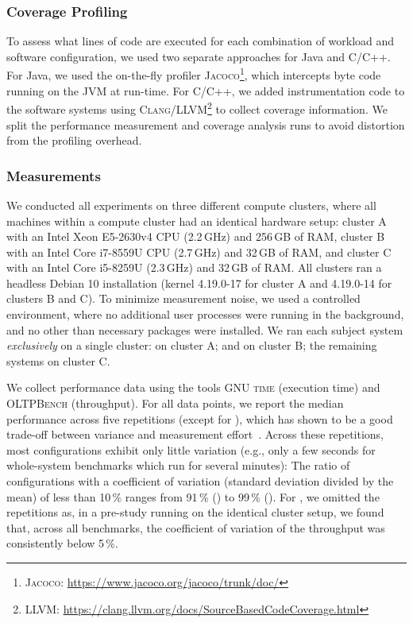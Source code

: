{\subsubsection{Coverage Profiling}\label{sec:profiling}
To assess what lines of code are executed for each combination of workload and software configuration, we used two separate approaches for Java and C/C++. For Java, we used the on-the-fly profiler \textsc{Jacoco}\footnote{\textsc{Jacoco}: \url{https://www.jacoco.org/jacoco/trunk/doc/}}, which intercepts byte code running on the JVM at run-time. For C/C++, we added instrumentation code to the software systems using \textsc{Clang/LLVM}\footnote{\textsc{LLVM}: \url{https://clang.llvm.org/docs/SourceBasedCodeCoverage.html}} to collect coverage information. We split the performance measurement and coverage analysis runs to  avoid distortion from the profiling overhead.
	
\subsubsection{Measurements}\label{sec:measurement_setup}
We conducted all experiments on three different compute clusters, where all machines within a compute cluster had an identical hardware setup: cluster A with an Intel Xeon E5-2630v4 CPU (2.2\,GHz) and 256\,GB of RAM, cluster B  with an Intel Core i7-8559U CPU (2.7\,GHz) and 32\,GB of RAM, and cluster C with an Intel Core i5-8259U (2.3\,GHz) and 32\,GB of RAM. All clusters ran a headless Debian 10 installation (kernel 4.19.0-17 for cluster A and 4.19.0-14 for clusters B and C). To minimize measurement noise, we used a controlled environment, where no additional user processes were running in the background, and no other than necessary packages were installed. 
We ran each subject system \textit{exclusively} on a single cluster: \htwo on cluster A; \dconvert and \batik on cluster B; the remaining systems on cluster C.

{We collect performance data using the tools \textsc{GNU time} (execution time) and \textsc{OLTPBench} (throughput).} For all data points, we report the median performance across five repetitions (except for \htwo), which has shown to be a good trade-off between variance and measurement effort~\cite{molyneauxArtApplicationPerformance2015}. 
{Across these repetitions, most configurations exhibit only little variation (e.g., only a few seconds for whole-system benchmarks which run for several minutes): The ratio of configurations with a coefficient of variation (standard deviation divided by the mean) of less than 10\,\% ranges from 91\,\% (\lrzip) to 99\,\% (\xzwo).}
For \htwo, we omitted the repetitions as, in a pre-study running on the identical cluster setup, we found that, across all benchmarks, the coefficient of variation of the throughput was consistently below 5\,\%.

}
